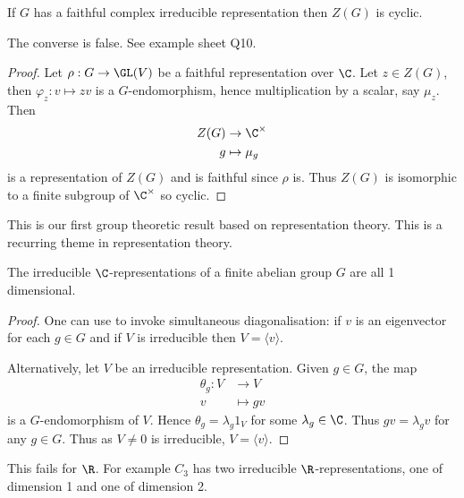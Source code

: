 \documentclass[a4paper]{article}
\theoremstyle{definition}
\begin{document}
\begin{corollary}
  If \(G\) has a faithful complex irreducible representation then \(Z(G)\) is cyclic.
\end{corollary}

\begin{remark}
  The converse is false. See example sheet Q10.
\end{remark}

\begin{proof}
  Let \(\rho: G \to \GL(V)\) be a faithful representation over \(\C\). Let \(z \in Z(G)\), then \(\varphi_z: v \mapsto zv\) is a \(G\)-endomorphism, hence multiplication by a scalar, say \(\mu_z\). Then
  \begin{align*}
    Z(G) &\to \C^\times \\
    g &\mapsto \mu_g
  \end{align*}
  is a representation of \(Z(G)\) and is faithful since \(\rho\) is. Thus \(Z(G)\) is isomorphic to a finite subgroup of \(\C^\times\) so cyclic.
\end{proof}

This is our first group theoretic result based on representation theory. This is a recurring theme in representation theory.

\begin{corollary}
  The irreducible \(\C\)-representations of a finite abelian group \(G\) are all 1 dimensional.
\end{corollary}

\begin{proof}
  One can use  to invoke simultaneous diagonalisation: if \(v\) is an eigenvector for each \(g \in G\) and if \(V\) is irreducible then \(V = \langle v \rangle\).

  Alternatively, let \(V\) be an irreducible representation. Given \(g \in G\), the map
  \begin{align*}
    \theta_g: V &\to V \\
    v &\mapsto gv
  \end{align*}
  is a \(G\)-endomorphism of \(V\). Hence \(\theta_g = \lambda_g 1_V\) for some \(\lambda_g \in \C\). Thus \(gv = \lambda_g v\) for any \(g \in G\). Thus as \(V \neq 0\) is irreducible, \(V = \langle v \rangle\).
\end{proof}

\begin{remark}
  This fails for \(\R\). For example \(C_3\) has two irreducible \(\R\)-representations, one of dimension 1 and one of dimension 2.
\end{remark}
\end{document}
